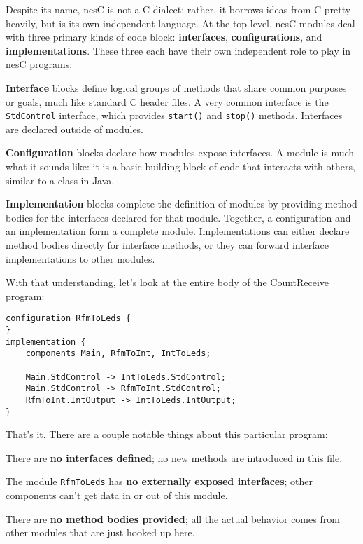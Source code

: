 \documentclass{article}
\begin{document}
Despite its name, nesC is not a C dialect; rather, it borrows ideas from C pretty heavily, but is its own independent language. At the top level, nesC modules deal with three primary kinds of code block: \textbf{interfaces}, \textbf{configurations}, and \textbf{implementations}. These three each have their own independent role to play in nesC programs:

\begin{itemize*}
\item \textbf{Interface} blocks define logical groups of methods that share common purposes or goals, much like standard C header files. A very common interface is the \verb!StdControl! interface, which provides \verb!start()! and \verb!stop()! methods. Interfaces are declared outside of modules.
\item \textbf{Configuration} blocks declare how modules expose interfaces. A module is much what it sounds like: it is a basic building block of code that interacts with others, similar to a class in Java.
\item \textbf{Implementation} blocks complete the definition of modules by providing method bodies for the interfaces declared for that module. Together, a configuration and an implementation form a complete module. Implementations can either declare method bodies directly for interface methods, or they can forward interface implementations to other modules.
\end{itemize*}

With that understanding, let's look at the entire body of the CountReceive program:

\begin{verbatim}
configuration RfmToLeds {
}
implementation {
    components Main, RfmToInt, IntToLeds;

    Main.StdControl -> IntToLeds.StdControl;
    Main.StdControl -> RfmToInt.StdControl;
    RfmToInt.IntOutput -> IntToLeds.IntOutput;
}
\end{verbatim}

That's it. There are a couple notable things about this particular program:

\begin{itemize*}
\item There are \textbf{no interfaces defined}; no new methods are introduced in this file.
\item The module \verb!RfmToLeds! has \textbf{no externally exposed interfaces}; other components can't get data in or out of this module.
\item There are \textbf{no method bodies provided}; all the actual behavior comes from other modules that are just hooked up here.
\end{itemize*}
\end{document}
